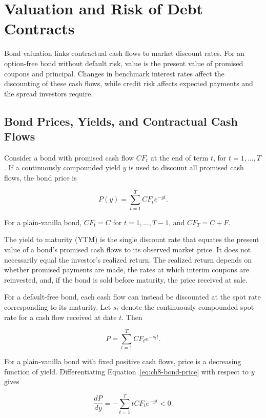 \section{Valuation and Risk of Debt Contracts}

Bond valuation links contractual cash flows to market discount rates. For an option-free bond without default risk, value is the present value of promised coupons and principal. Changes in benchmark interest rates affect the discounting of these cash flows, while credit risk affects expected payments and the spread investors require.

\subsection{Bond Prices, Yields, and Contractual Cash Flows}

Consider a bond with promised cash flow $CF_t$ at the end of term $t$, for $t=1,\ldots,T$. If a continuously compounded yield $y$ is used to discount all promised cash flows, the bond price is

\begin{equation}
P(y)
=
\sum_{t=1}^{T}
CF_t e^{-yt}.
\label{eq:ch8-bond-price}
\end{equation}

For a plain-vanilla bond, $CF_t=C$ for $t=1,\ldots,T-1$, and $CF_T=C+F$.

The yield to maturity (YTM) is the single discount
rate that equates the present value of a bond's
promised cash flows to its observed market price.
It does not necessarily equal the investor's realized
return. The realized return depends on whether
promised payments are made, the rates at which
interim coupons are reinvested, and, if the bond
is sold before maturity, the price received at sale.

For a default-free bond, each cash flow can instead be discounted at the spot rate corresponding to its maturity. Let $s_t$ denote the continuously compounded spot rate for a cash flow received at date $t$. Then

\begin{equation}
P
=
\sum_{t=1}^{T}
CF_t e^{-s_t t}.
\label{eq:ch8-bond-price-spot-rates}
\end{equation}

For a plain-vanilla bond with fixed positive cash flows, price is a decreasing function of yield. Differentiating Equation~\ref{eq:ch8-bond-price} with respect to $y$ gives

\begin{equation}
\frac{dP}{dy}
=
-\sum_{t=1}^{T}
tCF_t e^{-yt}
<0.
\label{eq:ch8-price-yield-negative}
\end{equation}

